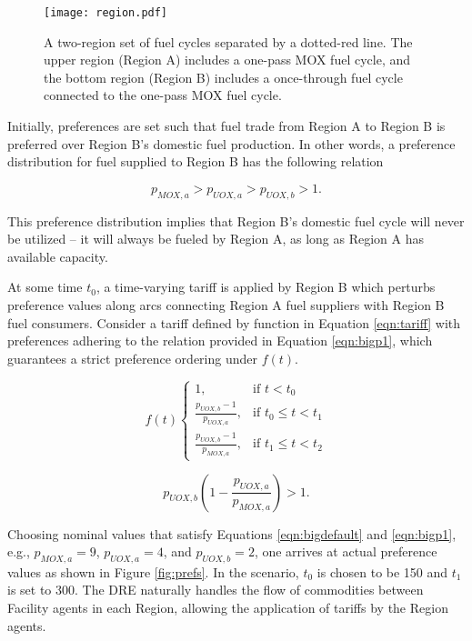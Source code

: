 \begin{figure}
  \begin{center}
    \texttt{[image: region.pdf]}
    \caption[]{
      \label{fig:region}
      A two-region set of fuel cycles separated by a dotted-red line. The upper
      region (Region A) includes a one-pass MOX fuel cycle, and the bottom
      region (Region B) includes a once-through fuel cycle connected to the
      one-pass MOX fuel cycle.}
  \end{center}
\end{figure}

Initially, preferences are set such that fuel trade from Region A to
Region B is preferred over Region B's domestic fuel production. In other words, a
preference distribution for fuel supplied to Region B has the following
relation

\begin{equation}\label{eqn:bigdefault}
  p_{MOX, a} > p_{UOX, a} > p_{UOX, b} > 1.
\end{equation}

\noindent
This preference distribution implies that Region B's domestic fuel cycle will
never be utilized -- it will always be fueled by Region A, as long as Region A
has available capacity. 

At some time $t_0$, a time-varying tariff is applied by Region B which perturbs
preference values along arcs connecting Region A fuel suppliers with Region B
fuel consumers. Consider a tariff defined by function in Equation
\ref{eqn:tariff} with preferences adhering to the relation provided in Equation
\ref{eqn:bigp1}, which guarantees a strict preference ordering under $f(t)$.

\begin{equation}\label{eqn:tariff}
f(t)
\begin{cases}
1, & \text{if } t < t_0 \\
\frac{p_{UOX, b} - 1}{p_{UOX, a}}, & \text{if } t_0 \leq t < t_1 \\
\frac{p_{UOX, b} - 1}{p_{MOX, a}}, & \text{if } t_1 \leq t < t_2
\end{cases} 
\end{equation}

\begin{equation}\label{eqn:bigp1}
  p_{UOX, b} \left( 1 - \frac{p_{UOX, a}}{p_{MOX, a}} \right) > 1.
\end{equation}

Choosing nominal values that satisfy Equations \ref{eqn:bigdefault} and
\ref{eqn:bigp1}, e.g., $p_{MOX, a} = 9$, $p_{UOX, a} = 4$, and $p_{UOX, b} = 2$,
one arrives at actual preference values as shown in Figure \ref{fig:prefs}. In
the \tariff scenario, $t_0$ is chosen to be 150 and $t_1$ is set to
300. The DRE naturally handles the flow of commodities between Facility agents
in each Region, allowing the application of tariffs by the Region agents.


